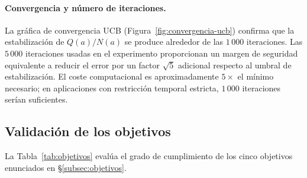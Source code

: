 \paragraph{Convergencia y número de iteraciones.} La gráfica de convergencia UCB (Figura~\ref{fig:convergencia-ucb}) confirma que la estabilización de $Q(a)/N(a)$ se produce alrededor de las $1\,000$ iteraciones. Las $5\,000$ iteraciones usadas en el experimento proporcionan un margen de seguridad equivalente a reducir el error por un factor $\sqrt{5}$ adicional respecto al umbral de estabilización. El coste computacional es aproximadamente $5\times$ el mínimo necesario; en aplicaciones con restricción temporal estricta, $1\,000$ iteraciones serían suficientes.

\subsection{Validación de los objetivos}
\label{subsec:validacion-objetivos}

La Tabla~\ref{tab:objetivos} evalúa el grado de cumplimiento de los cinco objetivos enunciados en §\ref{subsec:objetivos}.


